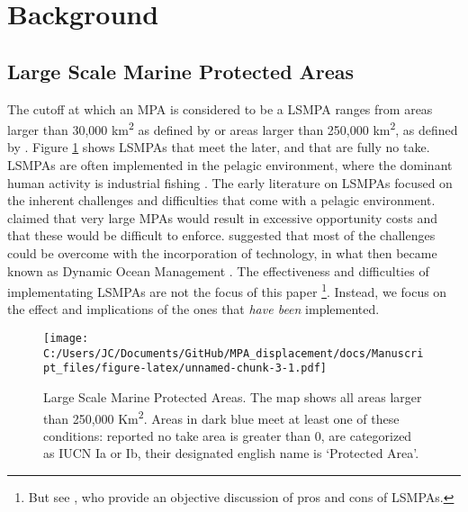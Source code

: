 \documentclass[11pt,]{article}
\let\rmarkdownfootnote\footnote%
\def\footnote{\protect\rmarkdownfootnote}
\begin{document}
\hypertarget{background}{%
\section{Background}\label{background}}

\hypertarget{large-scale-marine-protected-areas}{%
\subsection{Large Scale Marine Protected
Areas}\label{large-scale-marine-protected-areas}}

The cutoff at which an MPA is considered to be a LSMPA ranges from areas
larger than 30,000 km\textsuperscript{2} as defined by
\citet{desanto_2013} or areas larger than 250,000 km\textsuperscript{2},
as defined by \citep{toonen_2013}. Figure \ref{fig:LSMPAs_map} shows
LSMPAs that meet the later, and that are fully no take. LSMPAs are often
implemented in the pelagic environment, where the dominant human
activity is industrial fishing \citep{gray_2017,kroodsma_2018}. The
early literature on LSMPAs focused on the inherent challenges and
difficulties that come with a pelagic environment. \citet{kaplan_2010}
claimed that very large MPAs would result in excessive opportunity costs
and that these would be difficult to enforce. \citet{game_2009}
suggested that most of the challenges could be overcome with the
incorporation of technology, in what then became known as Dynamic Ocean
Management \citep{maxwell_2015}. The effectiveness and difficulties of
implementating LSMPAs are not the focus of this paper
\footnote{But see \citet{singleton_2014}, who provide an objective discussion of pros and cons of LSMPAs.}.
Instead, we focus on the effect and implications of the ones that
\emph{have been} implemented.

\begin{figure}
\centering
\texttt{[image: C:/Users/JC/Documents/GitHub/MPA\_displacement/docs/Manuscript\_files/figure-latex/unnamed-chunk-3-1.pdf]}
\caption{\label{fig:unnamed-chunk-3}\label{fig:LSMPAs_map}Large Scale Marine
Protected Areas. The map shows all areas larger than 250,000
Km\textsuperscript{2}. Areas in dark blue meet at least one of these
conditions: reported no take area is greater than 0, are categorized as
IUCN Ia or Ib, their designated english name is `Protected Area'.}
\end{figure}
\end{document}

